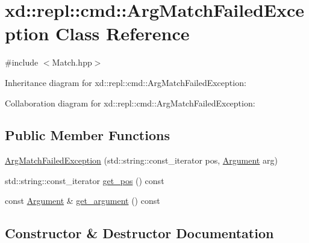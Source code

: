 \hypertarget{classxd_1_1repl_1_1cmd_1_1_arg_match_failed_exception}{}\section{xd\+:\+:repl\+:\+:cmd\+:\+:Arg\+Match\+Failed\+Exception Class Reference}
\label{classxd_1_1repl_1_1cmd_1_1_arg_match_failed_exception}


{\ttfamily \#include $<$Match.\+hpp$>$}



Inheritance diagram for xd\+:\+:repl\+:\+:cmd\+:\+:Arg\+Match\+Failed\+Exception\+:


Collaboration diagram for xd\+:\+:repl\+:\+:cmd\+:\+:Arg\+Match\+Failed\+Exception\+:
\subsection*{Public Member Functions}
\begin{DoxyCompactItemize}
\item 
\mbox{\hyperlink{classxd_1_1repl_1_1cmd_1_1_arg_match_failed_exception_a7d831d1b57b36b33b87a14fe00488edd}{Arg\+Match\+Failed\+Exception}} (std\+::string\+::const\+\_\+iterator pos, \mbox{\hyperlink{classxd_1_1repl_1_1cmd_1_1_argument}{Argument}} arg)
\item 
std\+::string\+::const\+\_\+iterator \mbox{\hyperlink{classxd_1_1repl_1_1cmd_1_1_arg_match_failed_exception_abf68eebdfc51a9c51d50d623d5d41a3d}{get\+\_\+pos}} () const
\item 
const \mbox{\hyperlink{classxd_1_1repl_1_1cmd_1_1_argument}{Argument}} \& \mbox{\hyperlink{classxd_1_1repl_1_1cmd_1_1_arg_match_failed_exception_a7c387e96af1c7fbe7de1038f3dbd1dd8}{get\+\_\+argument}} () const
\end{DoxyCompactItemize}


\subsection{Constructor \& Destructor Documentation}
\mbox{\label{classxd_1_1repl_1_1cmd_1_1_arg_match_failed_exception_a7d831d1b57b36b33b87a14fe00488edd}} 
